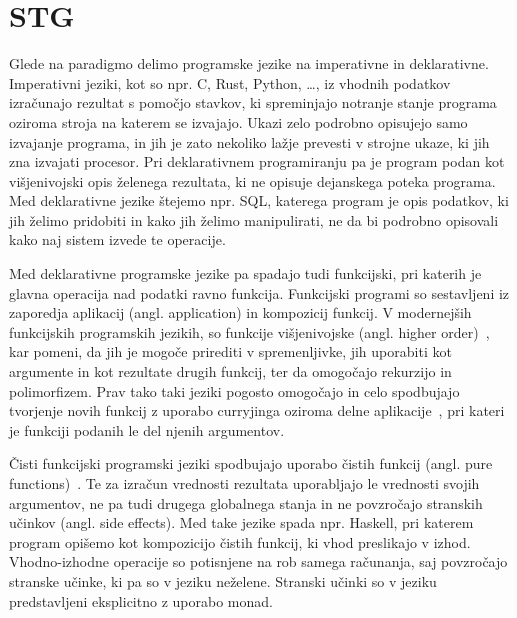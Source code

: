 \chapter{STG}
\label{ch:stg}

Glede na paradigmo delimo programske jezike na imperativne in deklarativne. Imperativni jeziki, kot so npr. C, Rust, Python, \dots, iz vhodnih podatkov izračunajo rezultat s pomočjo stavkov, ki spreminjajo notranje stanje programa oziroma stroja na katerem se izvajajo. Ukazi zelo podrobno opisujejo samo izvajanje programa, in jih je zato nekoliko lažje prevesti v strojne ukaze, ki jih zna izvajati procesor. Pri deklarativnem programiranju pa je program podan kot višjenivojski opis želenega rezultata, ki ne opisuje dejanskega poteka programa. Med deklarativne jezike štejemo npr. SQL, katerega program je opis podatkov, ki jih želimo pridobiti in kako jih želimo manipulirati, ne da bi podrobno opisovali kako naj sistem izvede te operacije.

Med deklarativne programske jezike pa spadajo tudi funkcijski, pri katerih je glavna operacija nad podatki ravno funkcija. Funkcijski programi so sestavljeni iz zaporedja aplikacij (angl. application) in kompozicij funkcij. V modernejših funkcijskih programskih jezikih, so funkcije višjenivojske (angl. higher order)~\cite{hudak1989conception}, kar pomeni, da jih je mogoče prirediti v spremenljivke, jih uporabiti kot argumente in kot rezultate drugih funkcij, ter da omogočajo rekurzijo in polimorfizem. Prav tako taki jeziki pogosto omogočajo in celo spodbujajo tvorjenje novih funkcij z uporabo curryjinga oziroma delne aplikacije~\cite{hudak1989conception}, pri kateri je funkciji podanih le del njenih argumentov.

Čisti funkcijski programski jeziki spodbujajo uporabo čistih funkcij (angl. pure functions)~\cite{hudak1989conception}. Te za izračun vrednosti rezultata uporabljajo le vrednosti svojih argumentov, ne pa tudi drugega globalnega stanja in ne povzročajo stranskih učinkov (angl. side effects). Med take jezike spada npr. Haskell, pri katerem program opišemo kot kompozicijo čistih funkcij, ki vhod preslikajo v izhod. Vhodno-izhodne operacije so potisnjene na rob samega računanja, saj povzročajo stranske učinke, ki pa so v jeziku neželene. Stranski učinki so v jeziku predstavljeni eksplicitno z uporabo monad. 

